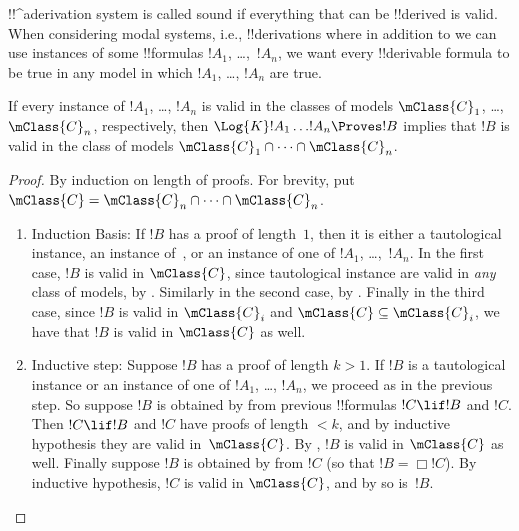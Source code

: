 \documentclass[../../../include/open-logic-section]{subfiles}
\begin{document}


!!^a{derivation} system is called sound if everything that can be
!!{derive}d is valid. When considering modal systems, i.e.,
!!{derivation}s where in addition to  we can use instances of
some !!{formula}s $!A_1$, \dots,~$!A_n$, we want every !!{derivable}
formula to be true in any model in which $!A_1$, \dots, $!A_n$ are
true.  

\begin{thm}
  If every instance of $!A_1$, \dots, $!A_n$ is valid in the
  classes of models $\mClass{C}_1$, \dots, $\mClass{C}_n$,
  respectively, then $\Log{K}!A_1\dots !A_n
  \Proves !B$ implies that $!B$ is valid in the class of
  models $\mClass{C}_1 \cap \dots \cap \mClass{C}_n$.
\end{thm}

\begin{proof}
  By induction on length of proofs. For brevity, put $\mClass{C} =
  \mClass{C}_n \cap \dots \cap \mClass{C}_n$.
  \begin{enumerate}
  \item Induction Basis: If $!B$ has a proof of length~$1$, then it is
    either a tautological instance, an instance
    of~, or an instance of
    one of $!A_1$, \dots,~$!A_n$. In the first case, $!B$ is valid in
    $\mClass{C}$, since tautological instance are valid in \emph{any}
    class of models, by . Similarly
    in the second case, by
    . Finally in the third case,
    since $!B$ is valid in $\mClass{C}_i$ and $\mClass{C} \subseteq
    \mClass{C}_i$, we have that $!B$ is valid in $\mClass{C}$ as well.
  \item Inductive step: Suppose $!B$ has a proof of length $k>1$. If
    $!B$ is a tautological instance or an instance of one of $!A_1$,
    \dots, $!A_n$, we proceed as in the previous step. So suppose $!B$ is
    obtained by \MP{} from previous !!{formula}s $!C \lif !B$ and
    $!C$. Then $!C \lif !B$ and $!C$ have proofs of length $<k$, and
    by inductive hypothesis they are valid in~$\mClass{C}$. By
    , $!B$ is valid in $\mClass{C}$ as
    well. Finally suppose $!B$ is obtained by \Nec{} from $!C$ (so
    that $!B = \Box!C$). By inductive hypothesis, $!C$ is valid in
    $\mClass{C}$, and by  so is~$!B$. \qedhere
  \end{enumerate}
\end{proof}
\end{document}
